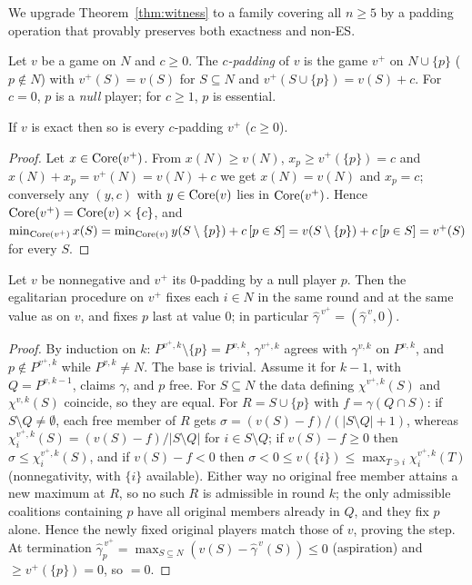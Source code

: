 We upgrade Theorem~\ref{thm:witness} to a family covering all $n\ge5$ by a
padding operation that provably preserves both exactness and non-ES.

\begin{definition}\label{def:pad}
Let $v$ be a game on $N$ and $c\ge0$. The \emph{$c$-padding} of $v$ is the game
$v^{+}$ on $N\cup\{p\}$ ($p\notin N$) with $v^{+}(S)=v(S)$ for $S\subseteq N$ and
$v^{+}(S\cup\{p\})=v(S)+c$. For $c=0$, $p$ is a \emph{null} player; for $c\ge1$,
$p$ is essential.
\end{definition}

\begin{lemma}\label{lem:padexact}
If $v$ is exact then so is every $c$-padding $v^{+}$ ($c\ge0$).
\end{lemma}

\begin{proof}
Let $x\in\operatorname{Core}(v^{+})$. From $x(N)\ge v(N)$, $x_p\ge v^{+}(\{p\})=c$ and
$x(N)+x_p=v^{+}(N)=v(N)+c$ we get $x(N)=v(N)$ and $x_p=c$; conversely any
$(y,c)$ with $y\in\operatorname{Core}(v)$ lies in $\operatorname{Core}(v^{+})$. Hence
$\operatorname{Core}(v^{+})=\operatorname{Core}(v)\times\{c\}$, and
$\min_{\operatorname{Core}(v^{+})}x(S)=\min_{\operatorname{Core}(v)}y(S\setminus\{p\})+c\,[p\in S]
=v(S\setminus\{p\})+c\,[p\in S]=v^{+}(S)$ for every $S$.
\end{proof}

\begin{lemma}\label{lem:inert}
Let $v$ be nonnegative and $v^{+}$ its $0$-padding by a null player $p$. Then the
egalitarian procedure on $v^{+}$ fixes each $i\in N$ in the same round and at the
same value as on $v$, and fixes $p$ last at value $0$; in particular
$\widehat\gamma^{\,v^{+}}=(\widehat\gamma^{\,v},0)$.
\end{lemma}

\begin{proof}
By induction on $k$: $P^{v^{+},k}\setminus\{p\}=P^{v,k}$, $\gamma^{v^{+},k}$
agrees with $\gamma^{v,k}$ on $P^{v,k}$, and $p\notin P^{v^{+},k}$ while
$P^{v,k}\neq N$. The base is trivial. Assume it for $k-1$, with $Q=P^{v,k-1}$,
claims $\gamma$, and $p$ free. For $S\subseteq N$ the data defining
$\chi^{v^{+},k}(S)$ and $\chi^{v,k}(S)$ coincide, so they are equal. For
$R=S\cup\{p\}$ with $f=\gamma(Q\cap S)$: if $S\setminus Q\neq\emptyset$, each free
member of $R$ gets $\sigma=(v(S)-f)/(|S\setminus Q|+1)$, whereas
$\chi^{v^{+},k}_i(S)=(v(S)-f)/|S\setminus Q|$ for $i\in S\setminus Q$; if
$v(S)-f\ge0$ then $\sigma\le\chi^{v^{+},k}_i(S)$, and if $v(S)-f<0$ then
$\sigma<0\le v(\{i\})\le\max_{T\ni i}\chi^{v^{+},k}_i(T)$ (nonnegativity, with
$\{i\}$ available). Either way no original free member attains a new maximum at
$R$, so no such $R$ is admissible in round $k$; the only admissible coalitions
containing $p$ have all original members already in $Q$, and they fix $p$ alone.
Hence the newly fixed original players match those of $v$, proving the step. At
termination $\widehat\gamma^{\,v^{+}}_p=\max_{S\subseteq
N}(v(S)-\widehat\gamma^{\,v}(S))\le0$ (aspiration) and $\ge v^{+}(\{p\})=0$, so
$=0$.
\end{proof}

